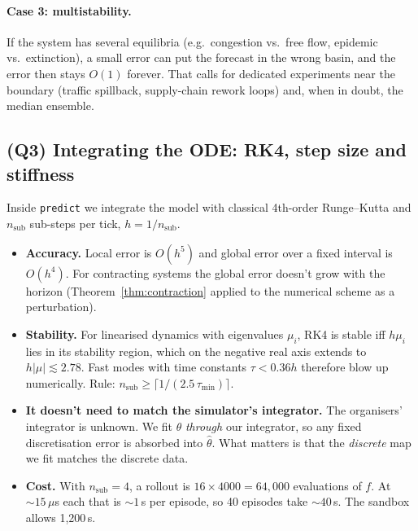 \documentclass[11pt]{article}
\theoremstyle{plain}
\theoremstyle{definition}
\theoremstyle{remark}
\newcommand{\abs}[1]{\left\lvert #1 \right\rvert}
\begin{document}
\paragraph{Case 3: multistability.} If the system has several equilibria (e.g.\ congestion vs.\ free flow, epidemic vs.\ extinction), a small error can put the forecast in the wrong basin, and the error then stays $O(1)$ forever. That calls for dedicated experiments near the boundary (traffic spillback, supply-chain rework loops) and, when in doubt, the median ensemble.

\subsection{(Q3) Integrating the ODE: RK4, step size and stiffness}
Inside \texttt{predict} we integrate the model with classical 4th-order Runge--Kutta and $n_{\text{sub}}$ sub-steps per tick, $h=1/n_{\text{sub}}$.
\begin{itemize}
\item \textbf{Accuracy.} Local error is $O(h^5)$ and global error over a fixed interval is $O(h^4)$. For contracting systems the global error doesn't grow with the horizon (Theorem~\ref{thm:contraction} applied to the numerical scheme as a perturbation).
\item \textbf{Stability.} For linearised dynamics with eigenvalues $\mu_i$, RK4 is stable iff $h\mu_i$ lies in its stability region, which on the negative real axis extends to $h\abs{\mu}\lesssim2.78$. Fast modes with time constants $\tau<0.36h$ therefore blow up numerically. Rule: $n_{\text{sub}}\ge\lceil 1/(2.5\,\tau_{\min})\rceil$.
\item \textbf{It doesn't need to match the simulator's integrator.} The organisers' integrator is unknown. We fit $\theta$ \emph{through} our integrator, so any fixed discretisation error is absorbed into $\hat\theta$. What matters is that the \emph{discrete} map we fit matches the discrete data.
\item \textbf{Cost.} With $n_{\text{sub}}=4$, a rollout is $16\times4000=64{,}000$ evaluations of $f$. At $\sim\!15\,\mu$s each that is $\sim\!1$\,s per episode, so 40 episodes take $\sim\!40$\,s. The sandbox allows 1,200\,s.
\end{itemize}
\end{document}

